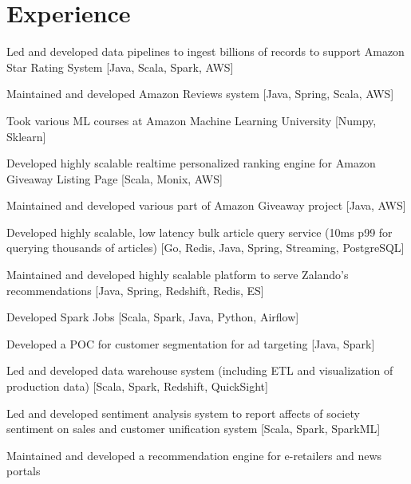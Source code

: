 \documentclass[]{furkanvarol-resume}
\begin{document}
\begin{minipage}[t]{0.66\textwidth}


\section{Experience}

\vspace{1.3em} %
\begin{tightemize}
\item Led and developed data pipelines to ingest billions of records to support Amazon Star Rating System [Java, Scala, Spark, AWS]
\item Maintained and developed Amazon Reviews system [Java, Spring, Scala, AWS]
\item Took various ML courses at Amazon Machine Learning University [Numpy, Sklearn]
\item Developed highly scalable realtime personalized ranking engine for Amazon Giveaway Listing Page [Scala, Monix, AWS]
\item Maintained and developed various part of Amazon Giveaway project [Java, AWS]
\end{tightemize}
\sectionsep

\begin{tightemize}
\item Developed highly scalable, low latency bulk article query service (10ms p99 for querying thousands of articles) [Go, Redis, Java, Spring, Streaming, PostgreSQL]
\item Maintained and developed highly scalable platform to serve Zalando's recommendations [Java, Spring, Redshift, Redis, ES]
\item Developed Spark Jobs [Scala, Spark, Java, Python, Airflow]
\end{tightemize}
\sectionsep

\begin{tightemize}
\item Developed a POC for customer segmentation for ad targeting [Java, Spark]
\item Led and developed data warehouse system (including ETL and visualization of production data) [Scala, Spark, Redshift, QuickSight]
\item Led and developed sentiment analysis system to report affects of society sentiment on sales and customer unification system [Scala, Spark, SparkML]
\item Maintained and developed a recommendation engine for e-retailers and news portals 
\end{tightemize}
\sectionsep


\end{minipage}
\end{document}
